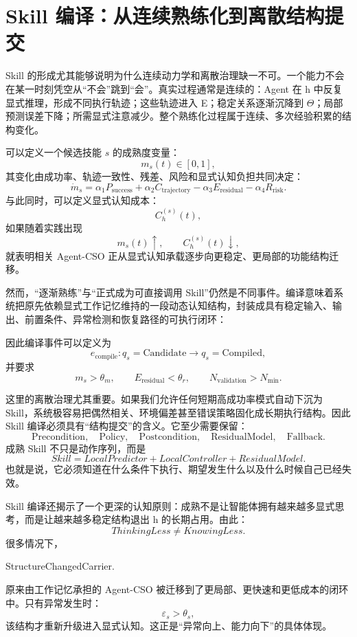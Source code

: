 \section{Skill 编译：从连续熟练化到离散结构提交}

Skill 的形成尤其能够说明为什么连续动力学和离散治理缺一不可。一个能力不会在某一时刻凭空从“不会”跳到“会”。真实过程通常是连续的：Agent 在 h 中反复显式推理，形成不同执行轨迹；这些轨迹进入 E；稳定关系逐渐沉降到 \(\Theta\)；局部预测误差下降；所需显式注意减少。整个熟练化过程属于连续、多次经验积累的结构变化。

可以定义一个候选技能 \(s\) 的成熟度变量：
\[
m_s(t)\in[0,1],
\]
其变化由成功率、轨迹一致性、残差、风险和显式认知负担共同决定：
\[
\dot m_s
=
\alpha_1 P_{\mathrm{success}}
+
\alpha_2 C_{\mathrm{trajectory}}
-
\alpha_3 E_{\mathrm{residual}}
-
\alpha_4 R_{\mathrm{risk}}.
\]
与此同时，可以定义显式认知成本：
\[
C_h^{(s)}(t),
\]
如果随着实践出现
\[
m_s(t)\uparrow,
\qquad
C_h^{(s)}(t)\downarrow,
\]
就表明相关 Agent-CSO 正从显式认知承载逐步向更稳定、更局部的功能结构迁移。

然而，“逐渐熟练”与“正式成为可直接调用 Skill”仍然是不同事件。编译意味着系统把原先依赖显式工作记忆维持的一段动态认知结构，封装成具有稳定输入、输出、前置条件、异常检测和恢复路径的可执行闭环：
\begin{statementbox}
\centering
{}
\end{statementbox}
因此编译事件可以定义为
\[
e_{\mathrm{compile}}
:
q_s=
\mathrm{Candidate}
\rightarrow
q_s=
\mathrm{Compiled},
\]
并要求
\[
m_s>\theta_m,
\qquad
E_{\mathrm{residual}}<\theta_r,
\qquad
N_{\mathrm{validation}}>N_{\min}.
\]

这里的离散治理尤其重要。如果我们允许任何短期高成功率模式自动下沉为 Skill，系统极容易把偶然相关、环境偏差甚至错误策略固化成长期执行结构。因此 Skill 编译必须具有“结构提交”的含义。它至少需要保留：
\[
\mathrm{Precondition},
\quad
\mathrm{Policy},
\quad
\mathrm{Postcondition},
\quad
\mathrm{ResidualModel},
\quad
\mathrm{Fallback}.
\]
成熟 Skill 不只是动作序列，而是
\[
\boxed{
Skill
=
LocalPredictor
+
LocalController
+
ResidualModel.
}
\]
也就是说，它必须知道在什么条件下执行、期望发生什么以及什么时候自己已经失效。

Skill 编译还揭示了一个更深的认知原则：成熟不是让智能体拥有越来越多显式思考，而是让越来越多稳定结构退出 h 的长期占用。由此：
\[
\boxed{
ThinkingLess\neq KnowingLess.
}
\]
很多情况下，
\begin{statementbox}
StructureChangedCarrier.
\end{statementbox}
原来由工作记忆承担的 Agent-CSO 被迁移到了更局部、更快速和更低成本的闭环中。只有异常发生时：
\[
\varepsilon_s>\theta_s,
\]
该结构才重新升级进入显式认知。这正是“异常向上、能力向下”的具体体现。

